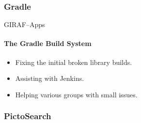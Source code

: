         \subsubsection{Gradle}
            \begin{frame}[t]{GIRAF--Apps}\framesubtitle{The Gradle Build System}
                \begin{itemize}
                    \item Fixing the initial broken library builds.
                    \item Assisting with Jenkins.
                    \item Helping various groups with small issues.
                \end{itemize}
            \end{frame}

        \subsubsection{PictoSearch}
